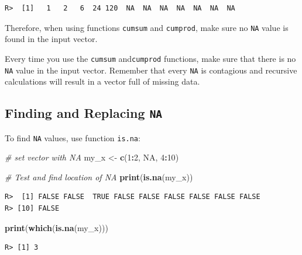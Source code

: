 \documentclass[
  12pt,
]{book}
\newenvironment{Shaded}{\begin{snugshade}}{\end{snugshade}}
\newcommand{\CommentTok}[1]{\textcolor[rgb]{0.37,0.37,0.37}{\textit{#1}}}
\newcommand{\DecValTok}[1]{\textcolor[rgb]{0.06,0.06,0.06}{#1}}
\newcommand{\KeywordTok}[1]{\textcolor[rgb]{0.27,0.27,0.27}{\textbf{#1}}}
\newcommand{\NormalTok}[1]{#1}
\newcommand{\OperatorTok}[1]{\textcolor[rgb]{0.43,0.43,0.43}{\textbf{#1}}}
\newcommand{\OtherTok}[1]{\textcolor[rgb]{0.37,0.37,0.37}{#1}}
\newcommand{\StringTok}[1]{\textcolor[rgb]{0.5,0.5,0.5}{#1}}
\newenvironment{rmdcaution}
{\begin{cautionblock}
		
	} {\end{cautionblock}}
\begin{document}
\begin{verbatim}
R>  [1]   1   2   6  24 120  NA  NA  NA  NA  NA  NA  NA
\end{verbatim}

Therefore, when using functions \texttt{cumsum} and \texttt{cumprod}, make sure no \texttt{NA} value is found in the input vector.

\begin{rmdcaution}
Every time you use the \texttt{cumsum} and\texttt{cumprod} functions,
make sure that there is no \texttt{NA} value in the input vector.
Remember that every \texttt{NA} is contagious and recursive calculations
will result in a vector full of missing data.
\end{rmdcaution}

\hypertarget{finding-and-replacing-na}{%
\subsection{\texorpdfstring{Finding and Replacing \texttt{NA}}{Finding and Replacing NA}}\label{finding-and-replacing-na}}

To find \texttt{NA} values, use function \texttt{is.na}: 

\begin{Shaded}
\begin{Highlighting}[]
\CommentTok{# set vector with NA}
\NormalTok{my_x <-}\StringTok{ }\KeywordTok{c}\NormalTok{(}\DecValTok{1}\OperatorTok{:}\DecValTok{2}\NormalTok{, }\OtherTok{NA}\NormalTok{, }\DecValTok{4}\OperatorTok{:}\DecValTok{10}\NormalTok{)}

\CommentTok{# Test and find location of NA}
\KeywordTok{print}\NormalTok{(}\KeywordTok{is.na}\NormalTok{(my_x))}
\end{Highlighting}
\end{Shaded}

\begin{verbatim}
R>  [1] FALSE FALSE  TRUE FALSE FALSE FALSE FALSE FALSE FALSE
R> [10] FALSE
\end{verbatim}

\begin{Shaded}
\begin{Highlighting}[]
\KeywordTok{print}\NormalTok{(}\KeywordTok{which}\NormalTok{(}\KeywordTok{is.na}\NormalTok{(my_x)))}
\end{Highlighting}
\end{Shaded}

\begin{verbatim}
R> [1] 3
\end{verbatim}
\end{document}
